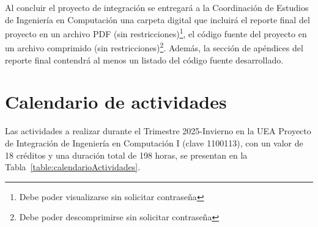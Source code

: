 	Al concluir el proyecto de integración se entregará a la Coordinación de Estudios de Ingeniería en Computación una carpeta digital que incluirá el reporte final del proyecto en un archivo PDF (sin restricciones)\footnote{Debe poder visualizarse sin solicitar contraseña}, el código fuente del proyecto en un archivo comprimido (sin restricciones)\footnote{Debe poder descomprimirse sin solicitar contraseña}. Además, la sección de apéndices del reporte final contendrá al menos un listado del código fuente desarrollado.


	\section{Calendario de actividades}

Las actividades a realizar durante el Trimestre 2025-Invierno en la UEA Proyecto de Integración de Ingeniería en Computación I (clave 1100113), con un valor de 18 créditos y una duración total de 198 horas, se presentan en la Tabla~\ref{table:calendarioActividades}.

